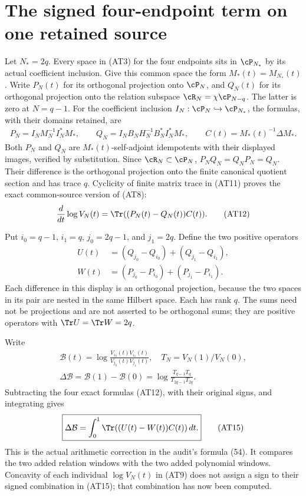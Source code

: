 \documentclass[11pt,a4paper]{article}
\begin{document}

\section{The signed four-endpoint term on one retained source}

Let $N_*=2q$. Every space in (AT3) for the four endpoints sits in
$\cP_{N_*}$ by its actual coefficient inclusion. Give this common
space the form $M_*(t)=M_{N_*}(t)$. Write $P_N(t)$ for its
orthogonal projection onto $\cP_N$, and $Q_N(t)$ for its
orthogonal projection onto the relation subspace
$\cR_N=\chi\cP_{N-q}$. The latter is zero at $N=q-1$.
For the coefficient inclusion $I_N:\cP_N\hookrightarrow\cP_{N_*}$,
the formulas, with their domains retained, are
\[
 \begin{gathered}
 P_N=I_NM_N^{-1}I_N^*M_*,\qquad
 Q_N=I_NB_NH_N^{-1}B_N^*I_N^*M_*,\qquad
 C(t)=M_*(t)^{-1}\Delta M_*.                   \end{gathered}
 \tag{AT11}
\]
Both $P_N$ and $Q_N$ are $M_*(t)$-self-adjoint idempotents with
their displayed images, verified by substitution. Since
$\cR_N\subset\cP_N$, $P_NQ_N=Q_NP_N=Q_N$. Their difference is
the orthogonal projection onto the finite canonical quotient
section and has trace $q$. Cyclicity of finite matrix trace in
(AT11) proves the exact common-source version of (AT8):
\[
 \frac{d}{dt}\log V_N(t)=\Tr((P_N(t)-Q_N(t))C(t)).
                                                        \tag{AT12}
\]

Put $i_0=q-1$, $i_1=q$, $j_0=2q-1$, and $j_1=2q$.
Define the two positive operators
\[
 \begin{split}
 U(t)&=(Q_{j_0}-Q_{i_0})+(Q_{j_1}-Q_{i_1}),\\
 W(t)&=(P_{j_0}-P_{i_0})+(P_{j_1}-P_{i_1}).    \end{split}
 \tag{AT13}
\]
Each difference in this display is an orthogonal projection,
because the two spaces in its pair are nested in the same
Hilbert space. Each has rank $q$. The sums need not be
projections and are not asserted to be orthogonal sums; they
are positive operators with $\Tr U=\Tr W=2q$.

Write
\[
 \begin{gathered}
 \mathcal B(t)=\log\frac{V_{i_0}(t)V_{i_1}(t)}{V_{j_0}(t)V_{j_1}(t)},
 \quad T_N=V_N(1)/V_N(0),\\
 \Delta\mathcal B=\mathcal B(1)-\mathcal B(0)
 =\log\frac{T_{q-1}T_q}{T_{2q-1}T_{2q}}.       \end{gathered}
 \tag{AT14}
\]
Subtracting the four exact formulas (AT12), with their original
signs, and integrating gives
\[
 \boxed{\displaystyle
 \Delta\mathcal B=\int_0^1\Tr((U(t)-W(t))C(t))\,dt .}
                                                        \tag{AT15}
\]
This is the actual arithmetic correction in the audit's formula
(54). It compares the two added relation windows with the two
added polynomial windows. Concavity of each individual
$\log V_N(t)$ in (AT9) does not assign a sign to their signed
combination in (AT15); that combination has now been computed.
\end{document}
